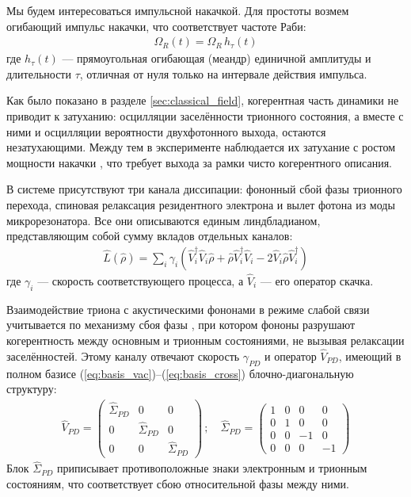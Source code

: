 \documentclass[11pt]{article}    %
\numberwithin{equation}{section}
\begin{document}
Мы будем интересоваться импульсной накачкой.
Для простоты возмем огибающий импульс накачки,
что соответствует частоте Раби:
\begin{gather}
    \Omega_R(t) = \Omega_R \, h_{\tau}(t)
\end{gather}
где $h_{\tau}(t)$ --- прямоугольная огибающая (меандр) единичной
амплитуды и длительности $\tau$, отличная от нуля только на интервале
действия импульса.

Как было показано в разделе \ref{sec:classical_field}, когерентная
часть динамики не приводит к затуханию: осцилляции заселённости
трионного состояния, а вместе с ними и осцилляции вероятности
двухфотонного выхода, остаются незатухающими. Между тем в эксперименте
наблюдается их затухание с ростом мощности накачки
\cite{krainov2025, ramsay2010}, что требует выхода за рамки чисто
когерентного описания.

В системе присутствуют три канала диссипации: фононный сбой фазы
трионного перехода, спиновая релаксация резидентного электрона и
вылет фотона из моды микрорезонатора. Все они описываются единым
линдбладианом, представляющим собой сумму вкладов отдельных каналов:
\begin{gather}
    \hat{L}(\hat{\rho}) = \sum_i \gamma_{i} \left( \hat{V}_i^{\dag} \hat{V}_i \hat{\rho} + \hat{\rho} \hat{V}_i^{\dag} \hat{V}_i - 2 \hat{V}_i \hat{\rho} \hat{V}_i^{\dag} \right)
    \label{eq:lindbladian}
\end{gather}
где $\gamma_i$ --- скорость соответствующего процесса, а $\hat{V}_i$ ---
его оператор скачка.

Взаимодействие триона с акустическими фононами
\cite{ramsay2010, nazir2016, glassl2013} в режиме слабой связи
учитывается по механизму сбоя фазы \cite{nazir2016, ramsay2010b}, при
котором фононы разрушают когерентность между основным и трионным
состояниями, не вызывая релаксации заселённостей. Этому каналу
отвечают скорость $\gamma_{PD}$ и оператор $\hat{V}_{PD}$, имеющий в
полном базисе (\ref{eq:basis_vac})--(\ref{eq:basis_cross})
блочно-диагональную структуру:
\begin{gather}
    \hat{V}_{PD} =
\begin{pmatrix}
    \hat{\Sigma}_{PD} & 0 & 0 \\
    0 & \hat{\Sigma}_{PD} & 0 \\
    0 & 0 & \hat{\Sigma}_{PD}
\end{pmatrix} \, ; \quad
    \hat{\Sigma}_{PD} =
\begin{pmatrix}
    1 & 0 & 0 & 0 \\
    0 & 1 & 0 & 0 \\
    0 & 0 & -1 & 0 \\
    0 & 0 & 0 & -1
\end{pmatrix}
\end{gather}
Блок $\hat{\Sigma}_{PD}$ приписывает противоположные знаки электронным
и трионным состояниям, что соответствует сбою относительной фазы между ними.
\end{document}
